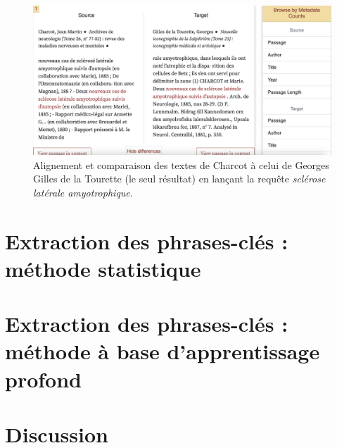 \begin{figure}[!h]
    \centering
    \includegraphics[width=1\textwidth]{img/textpair.png}
    \caption{Alignement et comparaison des textes de Charcot à celui de Georges Gilles de la Tourette (le seul résultat) en lançant la requête \textit{sclérose latérale amyotrophique}.}
    \label{fig:textpair}
\end{figure}
\section{Extraction des phrases-clés : méthode statistique}
\section{Extraction des phrases-clés : méthode à base d'apprentissage profond}
\section{Discussion}
